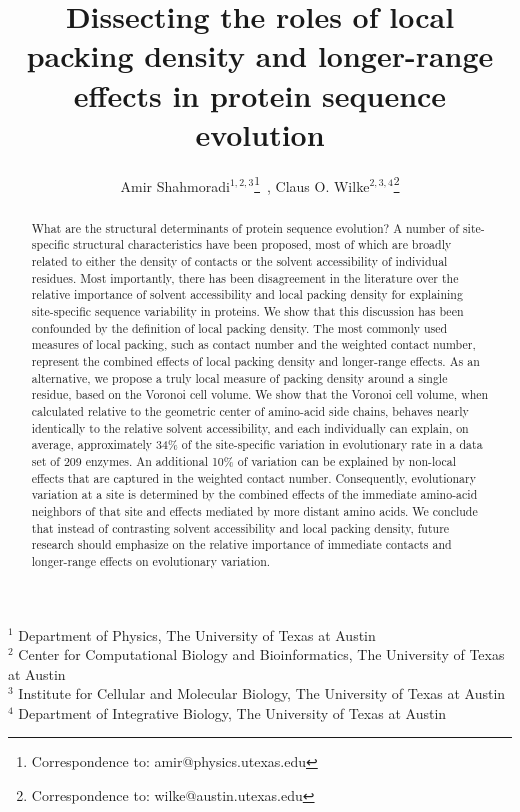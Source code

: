 \documentclass[12pt]{article}
\begin{document}
\title{Dissecting the roles of local packing density and longer-range effects in protein sequence evolution}

\author{Amir Shahmoradi$^{1,2,3}$\footnote{Correspondence to: amir@physics.utexas.edu}~, Claus O. Wilke$^{2,3,4}$\footnote{Correspondence to: wilke@austin.utexas.edu}}
\date{}
\maketitle

\noindent
$^1$ Department of Physics, The University of Texas at Austin\\
$^2$ Center for Computational Biology and Bioinformatics, The University of Texas at Austin\\
$^3$ Institute for Cellular and Molecular Biology, The University of Texas at Austin\\
$^4$ Department of Integrative Biology, The University of Texas at Austin\\


\begin{abstract}
What are the structural determinants of protein sequence evolution? A number of site-specific structural characteristics have been proposed, most of which are broadly related to either the density of contacts or the solvent accessibility of individual residues. Most importantly, there has been disagreement in the literature over the relative importance of solvent accessibility and local packing density for explaining site-specific sequence variability in proteins. We show that this discussion has been confounded by the definition of local packing density. The most commonly used measures of local packing, such as contact number and the weighted contact number, represent the combined effects of local packing density and longer-range effects. As an alternative, we propose a truly local measure of packing density around a single residue, based on the Voronoi cell volume. We show that the Voronoi cell volume, when calculated relative to the geometric center of amino-acid side chains, behaves nearly identically to the relative solvent accessibility, and each individually can explain, on average, approximately 34\% of the site-specific variation in evolutionary rate in a data set of 209 enzymes. An additional 10\% of variation can be explained by non-local effects that are captured in the weighted contact number. Consequently, evolutionary variation at a site is determined by the combined effects of the immediate amino-acid neighbors of that site and effects mediated by more distant amino acids. We conclude that instead of contrasting solvent accessibility and local packing density, future research should emphasize on the relative importance of immediate contacts and longer-range effects on evolutionary variation.
\end{abstract}
\end{document}
